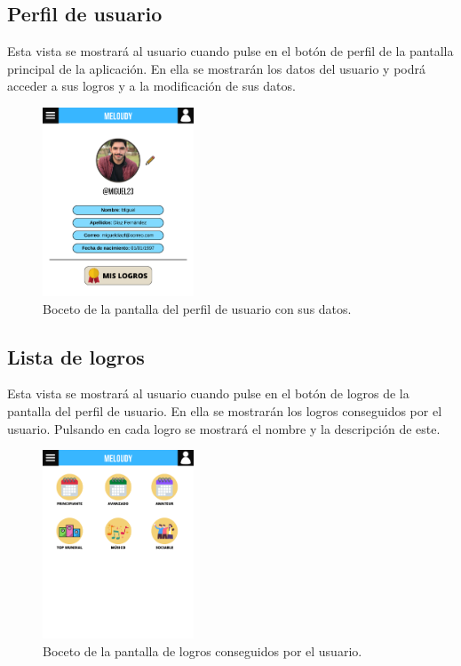 \subsection*{Perfil de usuario}

Esta vista se mostrará al usuario cuando pulse en el botón de perfil de la pantalla principal de la aplicación. En ella se mostrarán los datos del usuario y podrá acceder a sus logros y a la modificación de sus datos.
\begin{figure}[H]
    \centering
    \centerline{\includegraphics[width=0.40\textwidth, frame]{imagenes/c6/2.png}}
    \caption{Boceto de la pantalla del perfil de usuario con sus datos.}
    \label{fig:perfil}
\end{figure}

\subsection*{Lista de logros}

Esta vista se mostrará al usuario cuando pulse en el botón de logros de la pantalla del perfil de usuario. En ella se mostrarán los logros conseguidos por el usuario. Pulsando en cada logro se mostrará el nombre y la descripción de este.
\begin{figure}[H]
    \centering
    \centerline{\includegraphics[width=0.40\textwidth, frame]{imagenes/c6/3.png}}
    \caption{Boceto de la pantalla de logros conseguidos por el usuario.}
    \label{fig:logros}
\end{figure}

